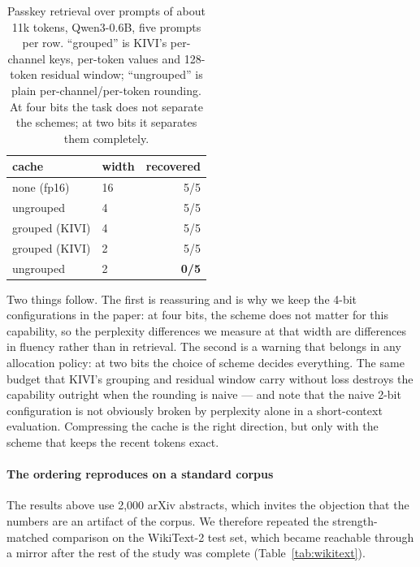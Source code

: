 \documentclass[5p]{elsarticle}
\begin{document}
\begin{table}[t]
\centering
\caption{Passkey retrieval over prompts of about 11k tokens, Qwen3-0.6B, five
prompts per row. ``grouped'' is KIVI's per-channel keys, per-token values and
128-token residual window; ``ungrouped'' is plain per-channel/per-token rounding.
At four bits the task does not separate the schemes; at two bits it separates them
completely.}
\label{tab:passkey}
\begin{tabular}{llr}
\toprule
cache & width & recovered \\
\midrule
none (fp16) & 16 & 5/5 \\
ungrouped & 4 & 5/5 \\
grouped (KIVI) & 4 & 5/5 \\
grouped (KIVI) & 2 & 5/5 \\
ungrouped & 2 & \textbf{0/5} \\
\bottomrule
\end{tabular}
\end{table}

Two things follow. The first is reassuring and is why we keep the 4-bit
configurations in the paper: at four bits, the scheme does not matter for this
capability, so the perplexity differences we measure at that width are differences
in fluency rather than in retrieval. The second is a warning that belongs in any
allocation policy: at two bits the choice of scheme decides everything. The same
budget that KIVI's grouping and residual window carry without loss destroys the
capability outright when the rounding is naive --- and note that the naive 2-bit
configuration is not obviously broken by perplexity alone in a short-context
evaluation. Compressing the cache is the right direction, but only with the
scheme that keeps the recent tokens exact.

\paragraph*{The ordering reproduces on a standard corpus}
The results above use 2{,}000 arXiv abstracts, which invites the objection that the
numbers are an artifact of the corpus. We therefore repeated the strength-matched
comparison on the WikiText-2 test set, which became reachable through a mirror
after the rest of the study was complete (Table~\ref{tab:wikitext}).
\end{document}
